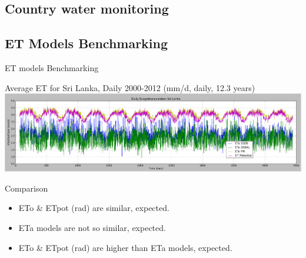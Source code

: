 \documentclass[aspectratio=169,unknownkeysallowed,xcolor=dvipsnames,beamer]{beamer} %
\begin{document}
\subsection{Country water monitoring}
{
\begin{frame}[plain]
\end{frame}}

\subsection{ET Models Benchmarking}
\begin{frame}[fragile]{ET models Benchmarking}

\begin{center}
 Average ET for Sri Lanka, Daily 2000-2012 (mm/d, daily, 12.3 years)
 \includegraphics[width=15cm]{sltemporaletb}
\end{center}

\begin{block}{Comparison}
\begin{itemize}
 \item ETo \& ETpot (rad) are similar, expected.
 \item ETa models are not so similar, expected.
 \item ETo \& ETpot (rad) are higher than ETa models, expected.
\end{itemize}

\end{block}
\end{frame}
\end{document}

